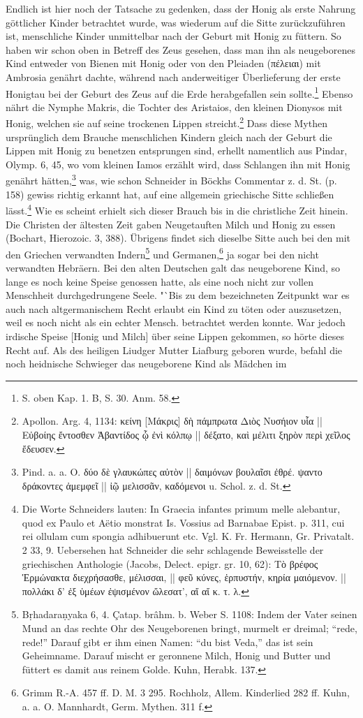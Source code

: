 \documentclass[a4paper, 11pt, oneside]{article}
\begin{document}
Endlich ist hier noch der Tatsache zu gedenken, dass der Honig als erste Nahrung göttlicher Kinder betrachtet wurde, was wiederum auf die Sitte zurückzuführen ist, menschliche Kinder unmittelbar nach der Geburt mit Honig zu füttern. So haben wir schon oben in Betreff des Zeus gesehen, dass man ihn als neugeborenes Kind entweder von Bienen mit Honig oder von den Pleiaden (πέλειαι) mit Ambrosia genährt dachte, während nach anderweitiger Überlieferung der erste Honigtau bei der Geburt des Zeus auf die Erde herabgefallen sein sollte.\footnote{S. oben Kap. 1. B, S. 30. Anm. 58.} Ebenso nährt die Nymphe Makris, die Tochter des Aristaios, den kleinen Dionysos mit Honig, welchen sie auf seine trockenen Lippen streicht.\footnote{Apollon. Arg. 4, 1134: κείνη [Μάκρις] δὴ πάμπρωτα Διὸς Νυσήιον υἷα || Εὐβοίης ἔντοσθεν Ἀβαντίδος ᾧ ἐνὶ κόλπῳ || δέξατο, καὶ μέλιτι ξηρὸν περὶ χεῖλος ἔδευσεν.} Dass diese Mythen ursprünglich dem Brauche menschlichen Kindern gleich nach der Geburt die Lippen mit Honig zu benetzen entsprungen sind, erhellt namentlich aus Pindar, Olymp. 6, 45, wo vom kleinen Iamos erzählt wird, dass Schlangen ihn mit Honig genährt hätten,\footnote{Pind. a. a. O. δύο δὲ γλαυκώπες αὐτὸν || δαιμόνων βουλαῖσι ἐθρέ. ψαντο δράκοντες ἀμεμφεῖ || ἰῷ μελισσᾶν, καδόμενοι u. Schol. z. d. St.} was, wie schon Schneider in Böckhs Commentar z. d. St. (p. 158) gewiss richtig erkannt hat, auf eine allgemein griechische Sitte schließen lässt.\footnote{Die Worte Schneiders lauten: In Graecia infantes primum melle alebantur, quod ex Paulo et Aëtio monstrat Is. Vossius ad Barnabae Epist. p. 311, cui rei ollulam cum spongia adhibuerunt etc. Vgl. K. Fr. Hermann, Gr. Privatalt. 2 33, 9. Uebersehen hat Schneider die sehr schlagende Beweisstelle der griechischen Anthologie (Jacobs, Delect. epigr. gr. 10, 62): Τὸ βρέφος Ἑρμώνακτα διεχρήσασθε, μέλισσαι, || φεῦ κύνες, ἑρπυστήν, κηρία μαιόμενον. || πολλάκι δ' ἐξ ὑμέων ἐψισμένον ὤλεσατ', αἴ αἴ κ. τ. λ.} Wie es scheint erhielt sich dieser Brauch bis in die christliche Zeit hinein. Die Christen der ältesten Zeit gaben Neugetauften Milch und Honig zu essen (Bochart, Hierozoic. 3, 388). Übrigens findet sich dieselbe Sitte auch bei den mit den Griechen verwandten Indern\footnote{Bṛhadaraṇyaka 6, 4. Çatap. brâhm. b. Weber S. 1108: Indem der Vater seinen Mund an das rechte Ohr des Neugeborenen bringt, murmelt er dreimal; "`rede, rede!"' Darauf gibt er ihm einen Namen: "`du bist Veda,"' das ist sein Geheimname. Darauf mischt er geronnene Milch, Honig und Butter und füttert es damit aus reinem Golde. Kuhn, Herabk. 137.} und Germanen,\footnote{Grimm R.-A. 457 ff. D. M. 3 295. Rochholz, Allem. Kinderlied 282 ff. Kuhn, a. a. O. Mannhardt, Germ. Mythen. 311 f.} ja sogar bei den nicht verwandten Hebräern. Bei den alten Deutschen galt das neugeborene Kind, so lange es noch keine Speise genossen hatte, als eine noch nicht zur vollen Menschheit durchgedrungene Seele. "`Bis zu dem bezeichneten Zeitpunkt war es auch nach altgermanischem Recht erlaubt ein Kind zu töten oder auszusetzen, weil es noch nicht als ein echter Mensch. betrachtet werden konnte. War jedoch irdische Speise [Honig und Milch] über seine Lippen gekommen, so hörte dieses Recht auf. Als des heiligen Liudger Mutter Liafburg geboren wurde, befahl die noch heidnische Schwieger das neugeborene Kind als Mädchen im 
\end{document}
